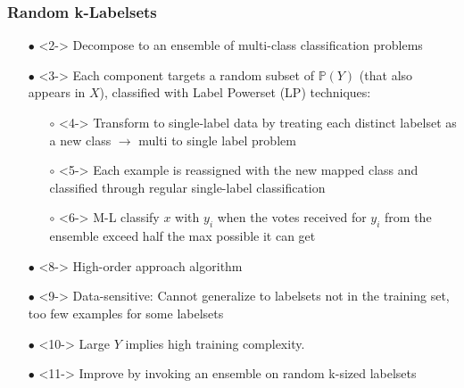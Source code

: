 \documentclass{beamer}
\begin{document}
\begin{frame}
\frametitle{Random k-Labelsets}
\begin{itemize}
\item[$\bullet$] <2-> Decompose to an ensemble of multi-class classification problems
\item[$\bullet$] <3-> Each component targets a random subset of $\mathbb{P}(Y)$ (that
  also appears in $X$), classified with Label Powerset (LP) techniques:
\begin{itemize}
\item[$\circ$] <4-> Transform to single-label data by treating each distinct labelset
  as a new class $\rightarrow$ multi to single label problem
\item[$\circ$] <5-> Each example is reassigned with the new mapped class and classified through regular single-label classification
\item[$\circ$] <6-> M-L classify $x$ with $y_i$ when the votes received for $y_i$ from the ensemble exceed half the max possible it can get
\end{itemize}
\end{itemize}
\begin{itemize}
\item[$\bullet$] <8-> High-order approach algorithm
\item[$\bullet$] <9-> Data-sensitive: Cannot generalize to labelsets not in the training set, too few examples for some labelsets
\item[$\bullet$] <10-> Large $Y$ implies high training complexity.
\item[$\bullet$] <11-> Improve by invoking an ensemble on random k-sized labelsets
\end{itemize}
\end{frame}
\end{document}
